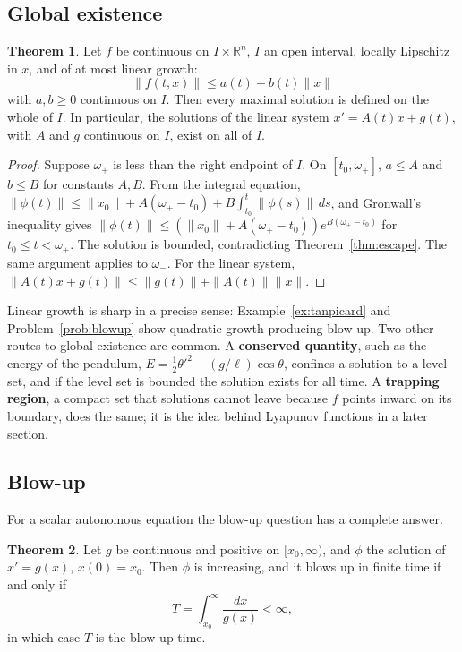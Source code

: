\documentclass[11pt,a4paper]{article}
\numberwithin{equation}{section}
\theoremstyle{definition}
\newtheorem{thm}{Theorem}[subsection]
\begin{document}
\subsection{Global existence}
\label{ssec:global}

\begin{thm}
\label{thm:global}
Let $f$ be continuous on $I \times \mathbb R^n$, $I$ an open interval, locally Lipschitz in $x$, and of at most linear growth:
\[
\|f(t, x)\| \leq a(t) + b(t)\|x\|
\]
with $a, b \geq 0$ continuous on $I$. Then every maximal solution is defined on the whole of $I$. In particular, the solutions of the linear system $x' = A(t)x + g(t)$, with $A$ and $g$
continuous on $I$, exist on all of $I$.
\end{thm}

\begin{proof}
Suppose $\omega_+$ is less than the right endpoint of $I$. On $[t_0, \omega_+]$, $a \leq A$ and $b \leq B$ for constants $A, B$. From the integral equation,
$\|\phi(t)\| \leq \|x_0\| + A(\omega_+ - t_0) + B\int_{t_0}^t\|\phi(s)\|\,ds$, and Gronwall's inequality gives $\|\phi(t)\| \leq (\|x_0\| + A(\omega_+ - t_0))e^{B(\omega_+ - t_0)}$ for $t_0 \leq t < \omega_+$. The solution is
bounded, contradicting Theorem~\ref{thm:escape}. The same argument applies to $\omega_-$. For the linear system, $\|A(t)x + g(t)\| \leq \|g(t)\| + \|A(t)\|\|x\|$.
\end{proof}

Linear growth is sharp in a precise sense: Example~\ref{ex:tanpicard} and Problem~\ref{prob:blowup} show quadratic growth producing blow-up. Two other routes to global
existence are common. A \textbf{conserved quantity}, such as the energy of the pendulum, $E = \frac12\theta'^2 - (g/\ell)\cos\theta$, confines a solution to a level set, and if the level set is
bounded the solution exists for all time. A \textbf{trapping region}, a compact set that solutions cannot leave because $f$ points inward on its boundary, does the same;
it is the idea behind Lyapunov functions in a later section.

\subsection{Blow-up}
\label{ssec:blowup}

For a scalar autonomous equation the blow-up question has a complete answer.

\begin{thm}
\label{thm:blowupscalar}
Let $g$ be continuous and positive on $[x_0, \infty)$, and $\phi$ the solution of $x' = g(x)$, $x(0) = x_0$. Then $\phi$ is increasing, and it blows up in finite time if and only if
\[
T = \int_{x_0}^\infty\frac{dx}{g(x)} < \infty,
\]
in which case $T$ is the blow-up time.
\end{thm}
\end{document}
